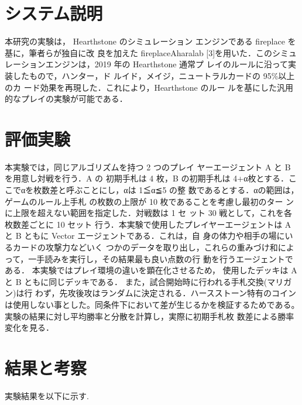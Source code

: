 \documentclass[twocolumn]{ltjsarticle}
\begin{document}
\section{システム説明}
\small{
  本研究の実験は， Hearthstone のシミュレーション
エンジンである fireplace を基に，筆者らが独自に改
良を加えた fireplaceAharalab [3]を用いた．このシミュ
レーションエンジンは，2019 年の Hearthstone 通常プ
レイのルールに沿って実装したもので，ハンター，ド
ルイド，メイジ，ニュートラルカードの 95\%以上のカ
ード効果を再現した．これにより，Hearthstone のルー
ルを基にした汎用的なプレイの実験が可能である．
}
\section{評価実験}
\small{
  本実験では，同じアルゴリズムを持つ 2 つのプレイ
ヤーエージェント A と B を用意し対戦を行う．A の
初期手札は 4 枚，B の初期手札は 4+α枚とする．こ
こでαを枚数差と呼ぶことにし，αは 1≦α≦5 の整
数であるとする．αの範囲は，ゲームのルール上手札
の枚数の上限が 10 枚であることを考慮し最初のター
ンに上限を超えない範囲を指定した．対戦数は 1 セ
ット 30 戦として，これを各枚数差ごとに 10 セット
行う．本実験で使用したプレイヤーエージェントは A
と B ともに Vector エージェントである．これは，自
身の体力や相手の場にいるカードの攻撃力などいく
つかのデータを取り出し，これらの重みづけ和によ
って，一手読みを実行し，その結果最も良い点数の行
動を行うエージェントである．
本実験ではプレイ環境の違いを顕在化させるため，
使用したデッキは A と B ともに同じデッキである．
また，試合開始時に行われる手札交換(マリガン)は行
わず，先攻後攻はランダムに決定される．ハースストーン特有のコインは使用しない事とした。同条件下において差が生じるかを検証するためである。
実験の結果に対し平均勝率と分散を計算し，実際に初期手札枚
数差による勝率変化を見る．
}
\section{結果と考察}
\small{
  実験結果を以下に示す.
}
\\%
\\
\end{document}
